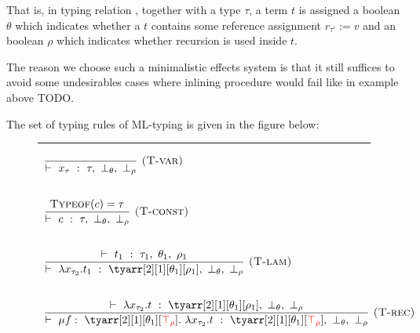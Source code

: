 \documentclass[a4paper,11pt,oneside]{article}
\theoremstyle{plain}
\newcommand{\typing}[4]{\vdash~#1~:~#2,~#3,~#4}
\newcommand{\bth}{\bot_\theta}
\newcommand{\brh}{\bot_\rho}
\newcommand{\trh}{\top_\rho}
\begin{document}
	That is, in typing relation , together with a type $\tau$, a term $t$ is assigned a boolean $\theta$ which indicates whether a $t$ contains some reference assignment $r_{\tau'}:=v$ and an boolean 
$\rho$ which indicates whether recursion is used inside $t$. 	
	
	The reason we choose such a minimalistic effects system is that it still suffices to avoid some undesirables cases where inlining procedure would fail like in example above TODO.
	
	The set of typing rules of ML-typing is given in the figure below:		
\begin{figure}[H]
\hrule
\begin{adjustwidth}{0em}{-3em}
\begin{small}
\begin{minipage}[t]{0.49\linewidth}
\begin{displaymath}
\begin{array}{l}

\dfrac
	{}
	{\typing{x_{\tau}}{\tau}{\bot_{\theta}}{\bot_{\rho}}}
	{\textsc{  (T-var)}} \\[1cm]

\dfrac
	{\textsc{Typeof}(c) = \tau}
	{\typing{c}{\tau}{\bot_{\theta}}{\bot_{\rho}}}
	{\textsc{  (T-const)}} \\[1cm]

	
\dfrac
	{\typing{t_1}{\tau_1}{\theta_1}{\rho_1}}
	{\typing{\lambda x_{\tau_2} . t_1}
		{\tyarr[2][1][\theta_1][\rho_1]}{\bth}{\brh}}
	{\textsc{  (T-lam)}} \\[1cm]		
	
\dfrac
	{\typing{\lambda x_{\tau_2}. t}{\tyarr[2][1][\theta_1][\rho_1]}{\bth}{\brh}}
	{\typing{\mu f:~\tyarr[2][1][\theta_1][\textcolor{red}{\trh}].~
		\lambda x_{\tau_2}. t}
		{\tyarr[2][1][\theta_1][\textcolor{red}{\trh}]}
			{\bth}{\brh}}
	{\textsc{  (T-rec)}}\\[1cm]		
	

\end{array}
\end{displaymath}
\end{minipage}
\end{small}
\end{adjustwidth}
\end{figure}
\end{document}
